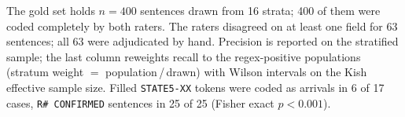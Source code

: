 \smallskip

\noindent\footnotesize The gold set holds $n=400$ sentences drawn from 16 strata; 400 of them were coded completely by both raters. The raters disagreed on at least one field for 63 sentences; all 63 were adjudicated by hand. Precision is reported on the stratified sample; the last column reweights recall to the regex-positive populations (stratum weight $=$ population\,/\,drawn) with Wilson intervals on the Kish effective sample size. Filled \texttt{STATE5-XX} tokens were coded as arrivals in 6 of 17 cases, \texttt{R\# CONFIRMED} sentences in 25 of 25 (Fisher exact $p<0.001$).
